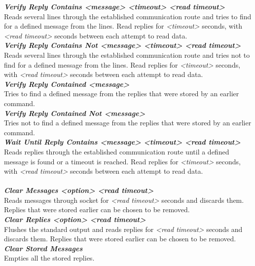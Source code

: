 \documentclass[english,12pt,a4paper,pdftex,elec,utf8]{aaltothesis}
\begin{document}
\textit{\textbf{Verify Reply Contains  <message> <timeout> <read timeout>}}\\
Reads several lines through the established communication route and tries to find for a defined message from the lines. Read replies for \textit{<timeout>} seconds, with \textit{<read timeout>} seconds between each attempt to read data.\\
\textit{\textbf{Verify Reply Contains Not  <message> <timeout> <read timeout>}}\\
Reads several lines through the established communication route and tries not to find for a defined message from the lines. Read replies for \textit{<timeout>} seconds, with \textit{<read timeout>} seconds between each attempt to read data.\\
\textit{\textbf{Verify Reply Contained  <message>}}\\
Tries to find a defined message from the replies that were stored by an earlier command. \\
\textit{\textbf{Verify Reply Contained Not  <message>}}\\
Tries not to find a defined message from the replies that were stored by an earlier command. \\
\textit{\textbf{Wait Until Reply Contains  <message> <timeout> <read timeout>}}\\
Reads replies through the established communication route until a defined message is found or a timeout is reached. Read replies for \textit{<timeout>} seconds, with \textit{<read timeout>} seconds between each attempt to read data.\\\\
\textit{\textbf{Clear Messages  <option> <read timeout>}}\\
Reads messages through socket for \textit{<read timeout>} seconds and discards them. Replies that were stored earlier can be chosen to be removed.\\
\textit{\textbf{Clear Replies  <option> <read timeout>}}\\
Flushes the standard output and reads replies for \textit{<read timeout>} seconds and discards them. Replies that were stored earlier can be chosen to be removed.\\
\textit{\textbf{Clear Stored Messages}}\\
Empties all the stored replies.\\
\end{document}
